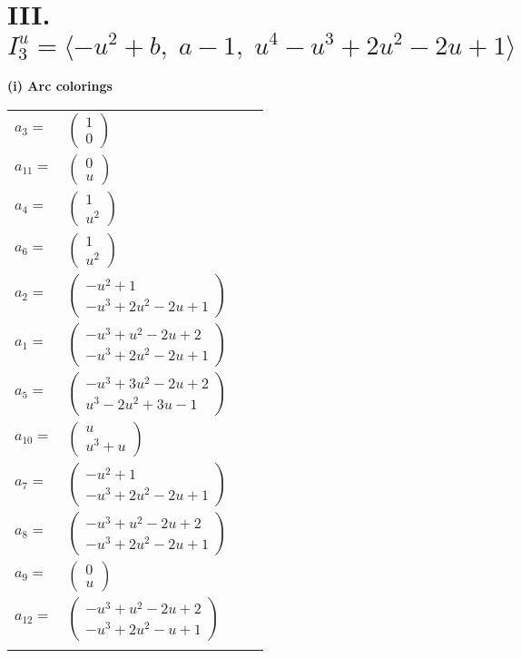 \documentclass[1p]{elsarticle_modified}
\theoremstyle{definition}
\begin{document}
\centering \section*{III. $I^u_{3}= \langle - u^2+b,\;a-1,\;u^4- u^3+2 u^2-2 u+1 \rangle$}
\flushleft \textbf{(i) Arc colorings}\\
\begin{tabular}{m{7pt} m{180pt} m{7pt} m{180pt} }
\flushright $a_{3}=$&$\begin{pmatrix}1\\0\end{pmatrix}$ \\
\flushright $a_{11}=$&$\begin{pmatrix}0\\u\end{pmatrix}$ \\
\flushright $a_{4}=$&$\begin{pmatrix}1\\u^2\end{pmatrix}$ \\
\flushright $a_{6}=$&$\begin{pmatrix}1\\u^2\end{pmatrix}$ \\
\flushright $a_{2}=$&$\begin{pmatrix}- u^2+1\\- u^3+2 u^2-2 u+1\end{pmatrix}$ \\
\flushright $a_{1}=$&$\begin{pmatrix}- u^3+u^2-2 u+2\\- u^3+2 u^2-2 u+1\end{pmatrix}$ \\
\flushright $a_{5}=$&$\begin{pmatrix}- u^3+3 u^2-2 u+2\\u^3-2 u^2+3 u-1\end{pmatrix}$ \\
\flushright $a_{10}=$&$\begin{pmatrix}u\\u^3+u\end{pmatrix}$ \\
\flushright $a_{7}=$&$\begin{pmatrix}- u^2+1\\- u^3+2 u^2-2 u+1\end{pmatrix}$ \\
\flushright $a_{8}=$&$\begin{pmatrix}- u^3+u^2-2 u+2\\- u^3+2 u^2-2 u+1\end{pmatrix}$ \\
\flushright $a_{9}=$&$\begin{pmatrix}0\\u\end{pmatrix}$ \\
\flushright $a_{12}=$&$\begin{pmatrix}- u^3+u^2-2 u+2\\- u^3+2 u^2- u+1\end{pmatrix}$\\&\end{tabular}
\end{document}
